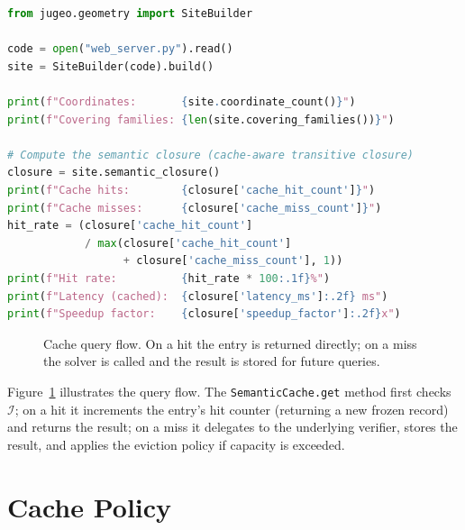 \documentclass[11pt]{article}
\newcommand{\Cache}{\mathcal{C}}                   %
\newcommand{\CacheIndex}{\mathcal{I}}              %
\newcommand{\CacheHit}{\mathsf{hit}}               %
\newcommand{\CacheMiss}{\mathsf{miss}}             %
\begin{document}
\begin{lstlisting}[language=Python, caption={Querying the semantic closure of a verification site with incremental caching.}]
from jugeo.geometry import SiteBuilder

code = open("web_server.py").read()
site = SiteBuilder(code).build()

print(f"Coordinates:       {site.coordinate_count()}")
print(f"Covering families: {len(site.covering_families())}")

# Compute the semantic closure (cache-aware transitive closure)
closure = site.semantic_closure()
print(f"Cache hits:        {closure['cache_hit_count']}")
print(f"Cache misses:      {closure['cache_miss_count']}")
hit_rate = (closure['cache_hit_count']
            / max(closure['cache_hit_count']
                  + closure['cache_miss_count'], 1))
print(f"Hit rate:          {hit_rate * 100:.1f}%")
print(f"Latency (cached):  {closure['latency_ms']:.2f} ms")
print(f"Speedup factor:    {closure['speedup_factor']:.2f}x")
\end{lstlisting}

\begin{figure}[t]
\centering
{}
\caption{Cache query flow.  On a hit the entry is returned directly;
on a miss the solver is called and the result is stored for future
queries.}
\label{fig:cache-flow}
\end{figure}

Figure~\ref{fig:cache-flow} illustrates the query flow.  The
\texttt{SemanticCache.get} method first checks $\CacheIndex$; on a
hit it increments the entry's hit counter (returning a new frozen
record) and returns the result; on a miss it delegates to the
underlying verifier, stores the result, and applies the eviction
policy if capacity is exceeded.

\section{Cache Policy}\label{sec:cache-policy}
\end{document}
